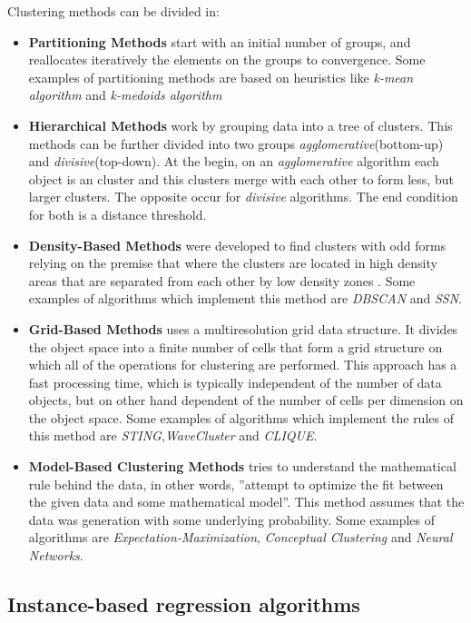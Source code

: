Clustering methods can be divided in\cite{HanKam06}:
\begin{itemize}
\item \textbf{Partitioning Methods} start with an initial number of groups, and reallocates iteratively the elements on the groups
to convergence\cite{DBLP:journals/corr/abs-1205-1117}. Some examples of partitioning methods are based on heuristics like \emph{k-mean algorithm}
and \emph{k-medoids algorithm}

\item \textbf{Hierarchical Methods} work by grouping data into a tree of clusters\cite{HanKam06}. This methods can be further divided into two
groups \emph{agglomerative}(bottom-up) and \emph{divisive}(top-down)\cite{DBLP:journals/corr/abs-1205-1117}. At the begin, on an \emph{agglomerative} algorithm
each object is an cluster and this clusters merge with each other to form less, but larger clusters. The opposite occur for \emph{divisive} algorithms. The end 
condition for both is a distance threshold.\cite{HanKam06}

\item \textbf{Density-Based Methods} were developed to find clusters with odd forms relying on the premise that where the clusters are located in high density areas
that are separated from each other by low density zones \cite{HanKam06}. Some examples of algorithms which implement this method are \emph{DBSCAN} and \emph{SSN}.

\item \textbf{Grid-Based Methods} uses a multiresolution grid data structure. It divides the object space into a finite number of cells that
form a grid structure on which all of the operations for clustering are performed. This approach has a fast processing time,
which is typically independent of the number of data objects, but on other hand dependent of the number of cells per dimension on the object space\cite{HanKam06}.
Some examples of algorithms which implement the rules of this method are \emph{STING},\emph{WaveCluster} and \emph{CLIQUE}.

\item \textbf{Model-Based Clustering Methods} tries to understand the mathematical rule behind the data, in other words,
''attempt to optimize the fit between the given data and some mathematical model''\cite[p. 429]{HanKam06}. This method assumes 
that the data was generation with some underlying probability. Some examples of algorithms are \emph{Expectation-Maximization},
\emph{Conceptual Clustering} and \emph{Neural Networks}.

\end{itemize}

\subsection{Instance-based regression algorithms}\label{sec:instance}
